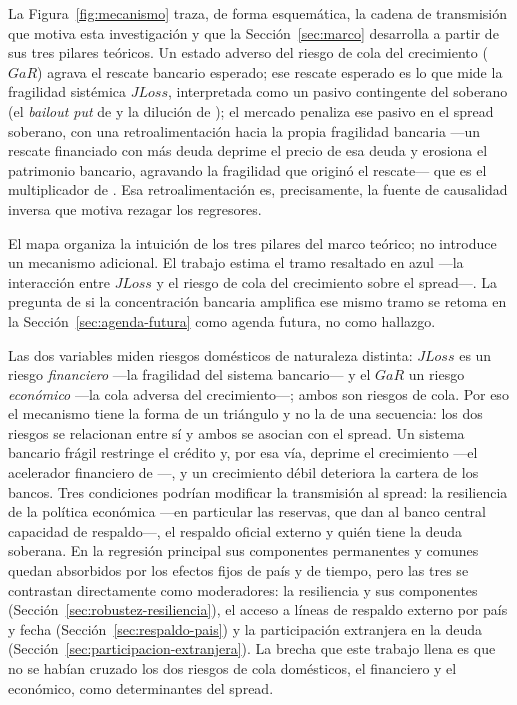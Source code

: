 La Figura~\ref{fig:mecanismo} traza, de forma esquemática, la cadena de transmisión que motiva esta investigación y que la Sección~\ref{sec:marco} desarrolla a partir de sus tres pilares teóricos. Un estado adverso del riesgo de cola del crecimiento ($GaR$) agrava el rescate bancario esperado; ese rescate esperado es lo que mide la fragilidad sistémica $JLoss$, interpretada como un pasivo contingente del soberano (el \textit{bailout put} de \citealp{FarhiTirole2018b} y la dilución de \citealp{AcharyaDrechslerSchnabl2014b}); el mercado penaliza ese pasivo en el spread soberano, con una retroalimentación hacia la propia fragilidad bancaria ---un rescate financiado con más deuda deprime el precio de esa deuda y erosiona el patrimonio bancario, agravando la fragilidad que originó el rescate--- que es el multiplicador de \citet{FarhiTirole2018b}. Esa retroalimentación es, precisamente, la fuente de causalidad inversa que motiva rezagar los regresores.

El mapa organiza la intuición de los tres pilares del marco teórico; no introduce un mecanismo adicional. El trabajo estima el tramo resaltado en azul ---la interacción entre $JLoss$ y el riesgo de cola del crecimiento sobre el spread---. La pregunta de si la concentración bancaria amplifica ese mismo tramo se retoma en la Sección~\ref{sec:agenda-futura} como agenda futura, no como hallazgo.

Las dos variables miden riesgos domésticos de naturaleza distinta: $JLoss$ es un riesgo \emph{financiero} ---la fragilidad del sistema bancario--- y el $GaR$ un riesgo \emph{económico} ---la cola adversa del crecimiento---; ambos son riesgos de cola. Por eso el mecanismo tiene la forma de un triángulo y no la de una secuencia: los dos riesgos se relacionan entre sí y ambos se asocian con el spread. Un sistema bancario frágil restringe el crédito y, por esa vía, deprime el crecimiento ---el acelerador financiero de \citet{BernankeGertlerGilchrist1996}---, y un crecimiento débil deteriora la cartera de los bancos. Tres condiciones podrían modificar la transmisión al spread: la resiliencia de la política económica ---en particular las reservas, que dan al banco central capacidad de respaldo---, el respaldo oficial externo y quién tiene la deuda soberana. En la regresión principal sus componentes permanentes y comunes quedan absorbidos por los efectos fijos de país y de tiempo, pero las tres se contrastan directamente como moderadores: la resiliencia y sus componentes (Sección~\ref{sec:robustez-resiliencia}), el acceso a líneas de respaldo externo por país y fecha (Sección~\ref{sec:respaldo-pais}) y la participación extranjera en la deuda (Sección~\ref{sec:participacion-extranjera}). La brecha que este trabajo llena es que no se habían cruzado los dos riesgos de cola domésticos, el financiero y el económico, como determinantes del spread.

